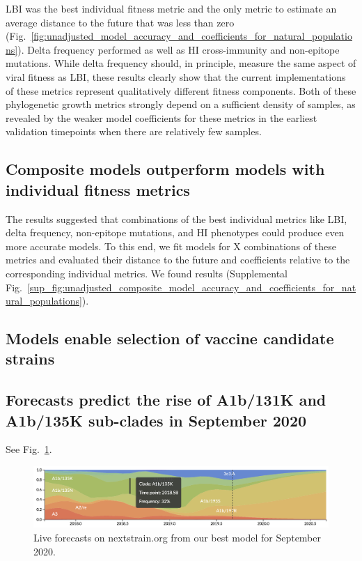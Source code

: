 LBI was the best individual fitness metric and the only metric to estimate an average distance to the future that was less than zero (Fig.~\ref{fig:unadjusted_model_accuracy_and_coefficients_for_natural_populations}).
Delta frequency performed as well as HI cross-immunity and non-epitope mutations.
While delta frequency should, in principle, measure the same aspect of viral fitness as LBI, these results clearly show that the current implementations of these metrics represent qualitatively different fitness components.
Both of these phylogenetic growth metrics strongly depend on a sufficient density of samples, as revealed by the weaker model coefficients for these metrics in the earliest validation timepoints when there are relatively few samples.

\subsection*{Composite models outperform models with individual fitness metrics}

The results suggested that combinations of the best individual metrics like LBI, delta frequency, non-epitope mutations, and HI phenotypes could produce even more accurate models.
To this end, we fit models for X combinations of these metrics and evaluated their distance to the future and coefficients relative to the corresponding individual metrics.
We found results (Supplemental Fig.~\ref{sup_fig:unadjusted_composite_model_accuracy_and_coefficients_for_natural_populations}).

\subsection*{Models enable selection of vaccine candidate strains}

\subsection*{Forecasts predict the rise of A1b/131K and A1b/135K sub-clades in September 2020}

See Fig.~\ref{fig:nextstrain_forecasts}.

\begin{figure}[t]
  \begin{center}
  \includegraphics[width=\textwidth]{figures/nextstrain-forecasts-for-september-2020.png}
  \caption{Live forecasts on nextstrain.org from our best model for September 2020.}
  \label{fig:nextstrain_forecasts}
  \end{center}
\end{figure}

